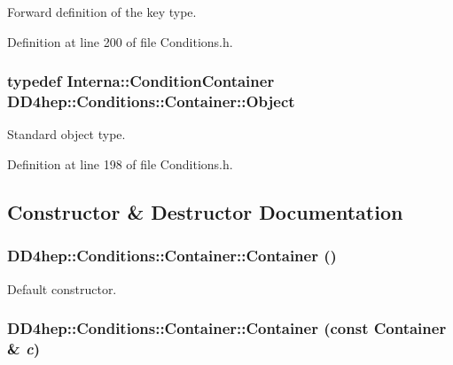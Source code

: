 Forward definition of the key type. 

Definition at line 200 of file Conditions.h.\hypertarget{class_d_d4hep_1_1_conditions_1_1_container_a45d612d4b81c549a40ca21e3318d3ddb}{
\subsubsection[{Object}]{\setlength{\rightskip}{0pt plus 5cm}typedef {\bf Interna::ConditionContainer} {\bf DD4hep::Conditions::Container::Object}}}
\label{class_d_d4hep_1_1_conditions_1_1_container_a45d612d4b81c549a40ca21e3318d3ddb}


Standard object type. 

Definition at line 198 of file Conditions.h.

\subsection{Constructor \& Destructor Documentation}
\hypertarget{class_d_d4hep_1_1_conditions_1_1_container_ad0e7655bed4af4372a7271a7ae15957f}{
\subsubsection[{Container}]{\setlength{\rightskip}{0pt plus 5cm}DD4hep::Conditions::Container::Container ()}}
\label{class_d_d4hep_1_1_conditions_1_1_container_ad0e7655bed4af4372a7271a7ae15957f}


Default constructor. \hypertarget{class_d_d4hep_1_1_conditions_1_1_container_a59770753d5b406ea121d2d71026f5a95}{
\subsubsection[{Container}]{\setlength{\rightskip}{0pt plus 5cm}DD4hep::Conditions::Container::Container (const {\bf Container} \& {\em c})}}
\label{class_d_d4hep_1_1_conditions_1_1_container_a59770753d5b406ea121d2d71026f5a95}


